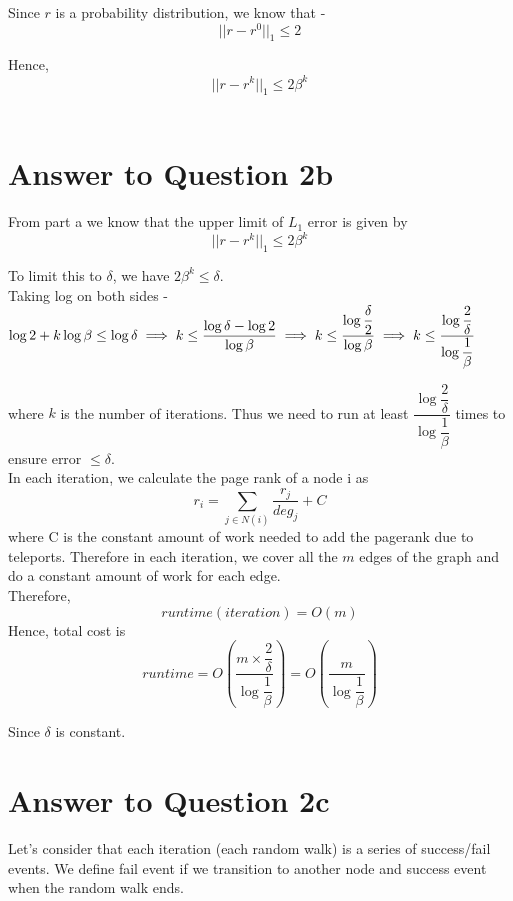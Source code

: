 \documentclass[11pt]{article}
\begin{document}
{Since $r$ is a probability distribution, we know that  - \\
$$||r-r^{0}||_1 \leq 2$$

Hence, $$||r - r^k||_1 \leq 2 \beta^k$$\

\pagebreak[4]
\section*{Answer to Question 2b}

From part a we know that the upper limit of $L_1$ error is given by $$||r - r^k||_1 \leq 2 \beta^k$$

To limit this to $\delta$, we have $2 \beta^k \leq \delta$.\\

Taking log on both sides - \
$
\log 2 + k \log \beta \leq \log \delta\\
\implies k \leq \dfrac{\log \delta - \log 2}{\log \beta}\\
\implies k \leq \dfrac{\log \dfrac{\delta}{2}}{\log \beta}
\implies k \leq \dfrac{\log \dfrac{2	}{\delta}}{\log \dfrac{1}{\beta}}
$\

where $k$ is the number of iterations. Thus we need to run at least $\dfrac{\log \dfrac{2	}{\delta}}{\log \dfrac{1}{\beta}}$ times to ensure error $\leq \delta$.\\

In each iteration, we calculate the page rank of a node i as 
$$ r_i = \sum_{j \in N(i)} \dfrac{r_j}{deg_j} + C$$
where C is the constant amount of work needed to add the pagerank due to teleports. Therefore in each iteration, we cover all the $m$ edges of the graph and do a constant amount of work for each edge.\\

Therefore, $$runtime(iteration) = O(m)$$
Hence, total cost is 
$$
runtime = O \left(\dfrac{m \times \dfrac{2}{\delta} }{\log \dfrac{1}{\beta}} \right) = O \left(\dfrac{m}{\log \dfrac{1}{\beta}} \right)
$$

Since $\delta$ is constant.

\pagebreak[4]
\section*{Answer to Question 2c}

Let's consider that each iteration (each random walk) is a series of success/fail events. We define fail event if we transition to another node and success event when the random walk ends.

}
\end{document}
